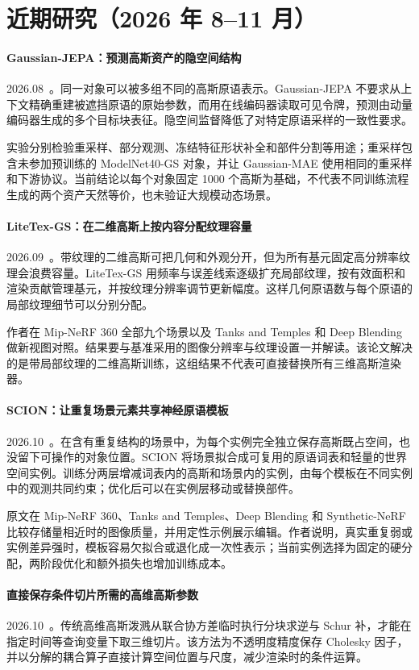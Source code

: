 \section{近期研究（2026 年 8--11 月）}
\paragraph{Gaussian-JEPA：预测高斯资产的隐空间结构}
2026.08~\cite{2608_15651}。同一对象可以被多组不同的高斯原语表示。Gaussian-JEPA 不要求从上下文精确重建被遮挡原语的原始参数，而用在线编码器读取可见令牌，预测由动量编码器生成的多个目标块表征。隐空间监督降低了对特定原语采样的一致性要求。

实验分别检验重采样、部分观测、冻结特征形状补全和部件分割等用途；重采样包含未参加预训练的 ModelNet40-GS 对象，并让 Gaussian-MAE 使用相同的重采样和下游协议。当前结论以每个对象固定 1000 个高斯为基础，不代表不同训练流程生成的两个资产天然等价，也未验证大规模动态场景。

\paragraph{LiteTex-GS：在二维高斯上按内容分配纹理容量}
2026.09~\cite{2609_23380}。带纹理的二维高斯可把几何和外观分开，但为所有基元固定高分辨率纹理会浪费容量。LiteTex-GS 用频率与误差线索逐级扩充局部纹理，按有效面积和渲染贡献管理基元，并按纹理分辨率调节更新幅度。这样几何原语数与每个原语的局部纹理细节可以分别分配。

作者在 Mip-NeRF 360 全部九个场景以及 Tanks and Temples 和 Deep Blending 做新视图对照。结果要与基准采用的图像分辨率与纹理设置一并解读。该论文解决的是带局部纹理的二维高斯训练，这组结果不代表可直接替换所有三维高斯渲染器。

\paragraph{SCION：让重复场景元素共享神经原语模板}
2026.10~\cite{2610_02322}。在含有重复结构的场景中，为每个实例完全独立保存高斯既占空间，也没留下可操作的对象位置。SCION 将场景拟合成可复用的原语词表和轻量的世界空间实例。训练分两层增减词表内的高斯和场景内的实例，由每个模板在不同实例中的观测共同约束；优化后可以在实例层移动或替换部件。

原文在 Mip-NeRF 360、Tanks and Temples、Deep Blending 和 Synthetic-NeRF 比较存储量相近时的图像质量，并用定性示例展示编辑。作者说明，真实重复弱或实例差异强时，模板容易欠拟合或退化成一次性表示；当前实例选择为固定的硬分配，两阶段优化和额外损失也增加训练成本。

\paragraph{直接保存条件切片所需的高维高斯参数}
2026.10~\cite{2610_22778}。传统高维高斯泼溅从联合协方差临时执行分块求逆与 Schur 补，才能在指定时间等查询变量下取三维切片。该方法为不透明度精度保存 Cholesky 因子，并以分解的耦合算子直接计算空间位置与尺度，减少渲染时的条件运算。

